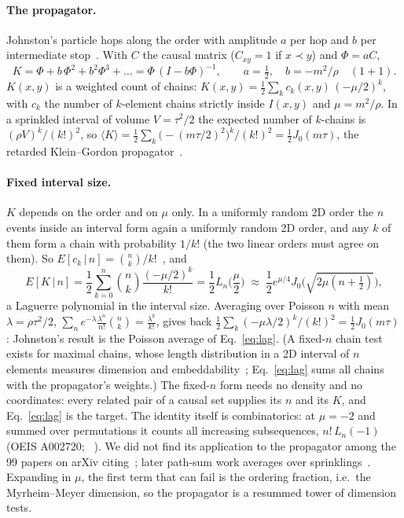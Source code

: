 \documentclass[11pt,a4paper]{article}
\begin{document}
\paragraph{The propagator.} Johnston's particle hops along the order with amplitude $a$ per hop and $b$ per intermediate stop~\cite{Johnston08}. With $C$ the causal matrix ($C_{xy}=1$ if $x\prec y$) and $\Phi=aC$,
\begin{equation}
K=\Phi+b\,\Phi^2+b^2\Phi^3+\dots=\Phi\,(I-b\Phi)^{-1},\qquad a=\tfrac12,\quad b=-m^2/\rho\quad(1+1).
\end{equation}
$K(x,y)$ is a weighted count of chains: $K(x,y)=\tfrac12\sum_k c_k(x,y)\,(-\mu/2)^k$, with $c_k$ the number of $k$-element chains strictly inside $I(x,y)$ and $\mu=m^2/\rho$. In a sprinkled interval of volume $V=\tau^2/2$ the expected number of $k$-chains is $(\rho V)^k/(k!)^2$, so $\langle K\rangle=\tfrac12\sum_k\big(-(m\tau/2)^2\big)^k/(k!)^2=\tfrac12J_0(m\tau)$, the retarded Klein--Gordon propagator~\cite{Johnston08}.

\paragraph{Fixed interval size.} $K$ depends on the order and on $\mu$ only. In a uniformly random 2D order the $n$ events inside an interval form again a uniformly random 2D order, and any $k$ of them form a chain with probability $1/k!$ (the two linear orders must agree on them). So $E[c_k\,|\,n]=\binom nk/k!$~\cite{Pinsky06}, and
\begin{equation}
E[K\,|\,n]=\frac12\sum_{k=0}^n\binom nk\frac{(-\mu/2)^k}{k!}=\frac12L_n\!\Big(\frac\mu2\Big)\;\approx\;\frac12e^{\mu/4}J_0\Big(\sqrt{2\mu(n+\tfrac12)}\Big),
\label{eq:lag}
\end{equation}
a Laguerre polynomial in the interval size. Averaging over Poisson $n$ with mean $\lambda=\rho\tau^2/2$, $\sum_ne^{-\lambda}\frac{\lambda^n}{n!}\binom nk=\frac{\lambda^k}{k!}$, gives back $\tfrac12\sum_k(-\mu\lambda/2)^k/(k!)^2=\tfrac12J_0(m\tau)$: Johnston's result is the Poisson average of Eq.~\eqref{eq:lag}. (A fixed-$n$ chain test exists for maximal chains, whose length distribution in a 2D interval of $n$ elements measures dimension and embeddability~\cite{ABP18}; Eq.~\eqref{eq:lag} sums all chains with the propagator's weights.) The fixed-$n$ form needs no density and no coordinates: every related pair of a causal set supplies its $n$ and its $K$, and Eq.~\eqref{eq:lag} is the target. The identity itself is combinatorics: at $\mu=-2$ and summed over permutations it counts all increasing subsequences, $n!\,L_n(-1)$ (OEIS A002720; ~\cite{LifschitzPittel81}). We did not find its application to the propagator among the 99 papers on arXiv citing~\cite{Johnston08,Johnston09}; later path-sum work averages over sprinklings~\cite{Shuman23,KastratiHinrichsen26}. Expanding in $\mu$, the first term that can fail is the ordering fraction, i.e.\ the Myrheim--Meyer dimension, so the propagator is a resummed tower of dimension tests.
\end{document}
